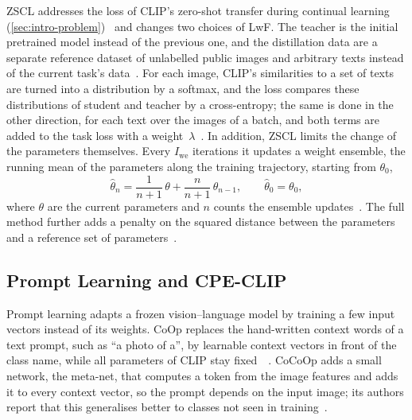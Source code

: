 ZSCL addresses the loss of CLIP's zero-shot transfer during continual learning (\cref{sec:intro-problem})~\cite[Sec.~1]{zheng2023preventingzeroshottransferdegradation} and changes two choices of LwF.
The teacher is the initial pretrained model instead of the previous one, and the distillation data are a separate reference dataset of unlabelled public images and arbitrary texts instead of the current task's data~\cite[Sec.~3.2]{zheng2023preventingzeroshottransferdegradation}.
For each image, CLIP's similarities to a set of texts are turned into a distribution by a softmax, and the loss compares these distributions of student and teacher by a cross-entropy; the same is done in the other direction, for each text over the images of a batch, and both terms are added to the task loss with a weight~$\lambda$~\cite[Sec.~3.2, Eqs.~2--4]{zheng2023preventingzeroshottransferdegradation}.
In addition, ZSCL limits the change of the parameters themselves.
Every $I_{\mathrm{we}}$ iterations it updates a weight ensemble, the running mean of the parameters along the training trajectory, starting from $\theta_0$,
\begin{equation}
\hat{\theta}_n = \frac{1}{n+1}\,\theta + \frac{n}{n+1}\,\hat{\theta}_{n-1}, \qquad \hat{\theta}_0 = \theta_0,
\label{eq:bg-we}
\end{equation}
where $\theta$ are the current parameters and $n$ counts the ensemble updates~\cite[Sec.~3.3, Eq.~7]{zheng2023preventingzeroshottransferdegradation}.
The full method further adds a penalty on the squared distance between the parameters and a reference set of parameters~\cite[Sec.~3.3, Eq.~5, Table~2]{zheng2023preventingzeroshottransferdegradation}.

\subsection{Prompt Learning and CPE-CLIP}
\label{subsec:bg-prompt}

Prompt learning adapts a frozen vision--language model by training a few input vectors instead of its weights.
CoOp replaces the hand-written context words of a text prompt, such as ``a photo of a'', by learnable context vectors in front of the class name, while all parameters of CLIP stay fixed~\cite{zhou2022coop}~\cite[Sec.~3.2]{zhou2022cocoop}.
CoCoOp adds a small network, the meta-net, that computes a token from the image features and adds it to every context vector, so the prompt depends on the input image; its authors report that this generalises better to classes not seen in training~\cite[Sec.~3.3, 4.1]{zhou2022cocoop}.

